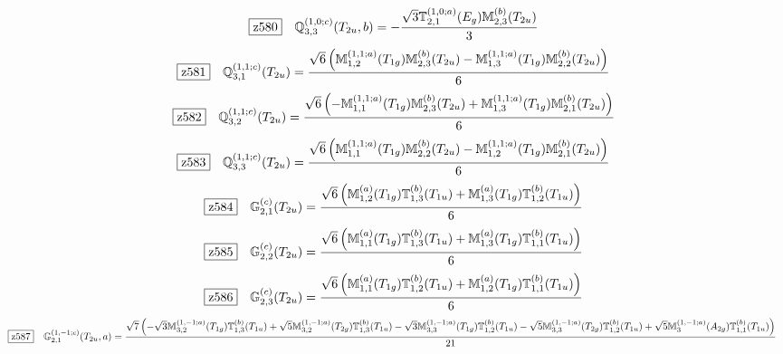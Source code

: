 \documentclass[fleqn,10pt,landscape]{jsarticle}
\begin{document}
\begin{dmath*}
\hspace*{3mm}\fbox{z580}\quad \mathbb{Q}_{3,3}^{(1,0;c)}(T_{2u},b)=- \frac{\sqrt{3} \mathbb{T}_{2,1}^{(1,0;a)}(E_{g}) \mathbb{M}_{2,3}^{(b)}(T_{2u})}{3}
\end{dmath*}
\begin{dmath*}
\hspace*{3mm}\fbox{z581}\quad \mathbb{Q}_{3,1}^{(1,1;c)}(T_{2u})=\frac{\sqrt{6} \left(\mathbb{M}_{1,2}^{(1,1;a)}(T_{1g}) \mathbb{M}_{2,3}^{(b)}(T_{2u}) - \mathbb{M}_{1,3}^{(1,1;a)}(T_{1g}) \mathbb{M}_{2,2}^{(b)}(T_{2u})\right)}{6}
\end{dmath*}
\begin{dmath*}
\hspace*{3mm}\fbox{z582}\quad \mathbb{Q}_{3,2}^{(1,1;c)}(T_{2u})=\frac{\sqrt{6} \left(- \mathbb{M}_{1,1}^{(1,1;a)}(T_{1g}) \mathbb{M}_{2,3}^{(b)}(T_{2u}) + \mathbb{M}_{1,3}^{(1,1;a)}(T_{1g}) \mathbb{M}_{2,1}^{(b)}(T_{2u})\right)}{6}
\end{dmath*}
\begin{dmath*}
\hspace*{3mm}\fbox{z583}\quad \mathbb{Q}_{3,3}^{(1,1;c)}(T_{2u})=\frac{\sqrt{6} \left(\mathbb{M}_{1,1}^{(1,1;a)}(T_{1g}) \mathbb{M}_{2,2}^{(b)}(T_{2u}) - \mathbb{M}_{1,2}^{(1,1;a)}(T_{1g}) \mathbb{M}_{2,1}^{(b)}(T_{2u})\right)}{6}
\end{dmath*}
\begin{dmath*}
\hspace*{3mm}\fbox{z584}\quad \mathbb{G}_{2,1}^{(c)}(T_{2u})=\frac{\sqrt{6} \left(\mathbb{M}_{1,2}^{(a)}(T_{1g}) \mathbb{T}_{1,3}^{(b)}(T_{1u}) + \mathbb{M}_{1,3}^{(a)}(T_{1g}) \mathbb{T}_{1,2}^{(b)}(T_{1u})\right)}{6}
\end{dmath*}
\begin{dmath*}
\hspace*{3mm}\fbox{z585}\quad \mathbb{G}_{2,2}^{(c)}(T_{2u})=\frac{\sqrt{6} \left(\mathbb{M}_{1,1}^{(a)}(T_{1g}) \mathbb{T}_{1,3}^{(b)}(T_{1u}) + \mathbb{M}_{1,3}^{(a)}(T_{1g}) \mathbb{T}_{1,1}^{(b)}(T_{1u})\right)}{6}
\end{dmath*}
\begin{dmath*}
\hspace*{3mm}\fbox{z586}\quad \mathbb{G}_{2,3}^{(c)}(T_{2u})=\frac{\sqrt{6} \left(\mathbb{M}_{1,1}^{(a)}(T_{1g}) \mathbb{T}_{1,2}^{(b)}(T_{1u}) + \mathbb{M}_{1,2}^{(a)}(T_{1g}) \mathbb{T}_{1,1}^{(b)}(T_{1u})\right)}{6}
\end{dmath*}
\begin{dmath*}
\hspace*{3mm}\fbox{z587}\quad \mathbb{G}_{2,1}^{(1,-1;c)}(T_{2u},a)=\frac{\sqrt{7} \left(- \sqrt{3} \mathbb{M}_{3,2}^{(1,-1;a)}(T_{1g}) \mathbb{T}_{1,3}^{(b)}(T_{1u}) + \sqrt{5} \mathbb{M}_{3,2}^{(1,-1;a)}(T_{2g}) \mathbb{T}_{1,3}^{(b)}(T_{1u}) - \sqrt{3} \mathbb{M}_{3,3}^{(1,-1;a)}(T_{1g}) \mathbb{T}_{1,2}^{(b)}(T_{1u}) - \sqrt{5} \mathbb{M}_{3,3}^{(1,-1;a)}(T_{2g}) \mathbb{T}_{1,2}^{(b)}(T_{1u}) + \sqrt{5} \mathbb{M}_{3}^{(1,-1;a)}(A_{2g}) \mathbb{T}_{1,1}^{(b)}(T_{1u})\right)}{21}
\end{dmath*}
\end{document}
